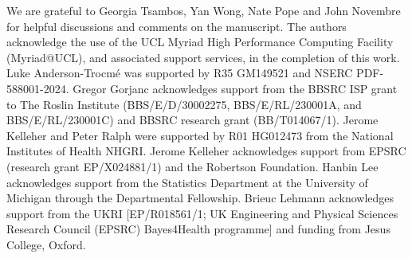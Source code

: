 
We are grateful to Georgia Tsambos, Yan Wong, Nate Pope and John Novembre
for helpful discussions and comments on the manuscript.
%
The authors acknowledge the use of the UCL Myriad High Performance Computing Facility (Myriad@UCL), and associated support services, in the completion of this work.
Luke Anderson-Trocm\'{e} was supported by R35 GM149521 and NSERC PDF-588001-2024.
%
Gregor Gorjanc acknowledges support from the BBSRC ISP grant to The Roslin Institute
(BBS/E/D/30002275, BBS/E/RL/230001A, and BBS/E/RL/230001C) and BBSRC research grant (BB/T014067/1).
%
Jerome Kelleher and Peter Ralph were supported by R01 HG012473
from the National Institutes of Health NHGRI.
%
Jerome Kelleher acknowledges support from EPSRC (research grant EP/X024881/1)
and the Robertson Foundation.
%
Hanbin Lee acknowledges support from the Statistics Department at the University of Michigan through the Departmental Fellowship.
%
Brieuc Lehmann acknowledges support from the UKRI [EP/R018561/1; UK Engineering and Physical Sciences Research Council (EPSRC) Bayes4Health programme] and funding from Jesus College, Oxford.
